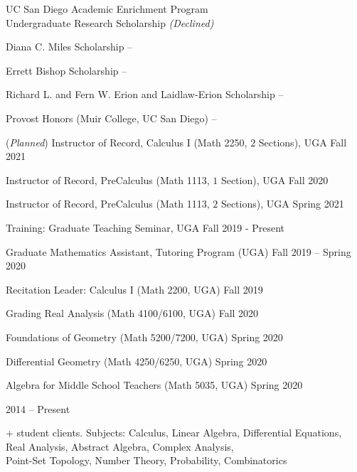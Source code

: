 \documentclass[letterpaper,MMMyyyy,nonstopmode]{simpleresumecv}
\begin{document}
\begin{Body}
\BulletItem
UC San Diego Academic Enrichment Program \\
Undergraduate Research Scholarship \textit{(Declined)}
\hfill{}

\BulletItem
Diana C. Miles Scholarship
\hfill{} -- 

\BulletItem
Errett Bishop Scholarship
\hfill{} -- 

\BulletItem
Richard L. and Fern W. Erion and Laidlaw-Erion Scholarship
\hfill{} -- 

\BulletItem
Provost Honors (Muir College, UC San Diego)
\hfill{} -- 

\Gap


\Gap

\BulletItem (\textit{Planned}) Instructor of Record, Calculus I (Math 2250, $2$ Sections), UGA 
\hfill Fall 2021

\BulletItem Instructor of Record, PreCalculus (Math 1113, $1$ Section), UGA
\hfill Fall 2020


\BulletItem Instructor of Record, PreCalculus (Math 1113, $2$ Sections), UGA
\hfill Spring 2021

\BulletItem Training: Graduate Teaching Seminar, UGA
\hfill Fall 2019 - Present

\Gap

\BulletItem Graduate Mathematics Assistant, Tutoring Program (UGA) 
\hfill Fall 2019 -- Spring 2020

\BulletItem Recitation Leader: Calculus I (Math 2200, UGA)
\hfill Fall 2019 

\BulletItem Grading 
\SubBulletItem Real Analysis (Math 4100/6100, UGA)
\hfill Fall 2020 

\SubBulletItem Foundations of Geometry (Math 5200/7200, UGA)
\hfill Spring 2020

\SubBulletItem Differential Geometry (Math 4250/6250, UGA)
\hfill Spring 2020

\SubBulletItem Algebra for Middle School Teachers (Math 5035, UGA) 
\hfill Spring 2020

\hfill
2014 -- Present
\Gap

\begin{Detail}
+ student clients.
\SubBulletItem 
Subjects:
Calculus, Linear Algebra, Differential Equations, \\
Real Analysis, Abstract Algebra, Complex Analysis, \\
Point-Set Topology, Number Theory, Probability, Combinatorics
\end{Detail}


\end{Body}
\end{document}
